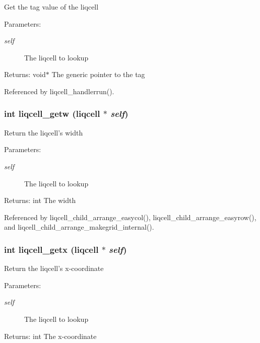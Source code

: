 Get the tag value of the liqcell \begin{Desc}
\item[Parameters:]
\begin{description}
\item[{\em self}]The liqcell to lookup \end{description}
\end{Desc}
\begin{Desc}
\item[Returns:]void$\ast$ The generic pointer to the tag \end{Desc}


Referenced by liqcell\_\-handlerrun().
\subsubsection[{liqcell\_\-getw}]{\setlength{\rightskip}{0pt plus 5cm}int liqcell\_\-getw (liqcell $\ast$ {\em self})}\label{d5/da2/liqcell_8c_32fe7856b3f5a305d1bf40779bd9f9b7}


Return the liqcell's width \begin{Desc}
\item[Parameters:]
\begin{description}
\item[{\em self}]The liqcell to lookup \end{description}
\end{Desc}
\begin{Desc}
\item[Returns:]int The width \end{Desc}


Referenced by liqcell\_\-child\_\-arrange\_\-easycol(), liqcell\_\-child\_\-arrange\_\-easyrow(), and liqcell\_\-child\_\-arrange\_\-makegrid\_\-internal().
\subsubsection[{liqcell\_\-getx}]{\setlength{\rightskip}{0pt plus 5cm}int liqcell\_\-getx (liqcell $\ast$ {\em self})}\label{d5/da2/liqcell_8c_cee27c164be931dac5c47741aabf2226}


Return the liqcell's x-coordinate \begin{Desc}
\item[Parameters:]
\begin{description}
\item[{\em self}]The liqcell to lookup \end{description}
\end{Desc}
\begin{Desc}
\item[Returns:]int The x-coordinate \end{Desc}
